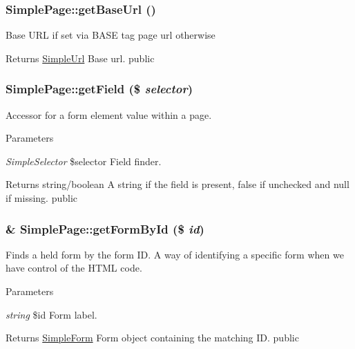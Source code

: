 \hypertarget{class_simple_page_a60f75babe73b4b88e1a22076090153b7}{
\subsubsection[{getBaseUrl}]{\setlength{\rightskip}{0pt plus 5cm}SimplePage::getBaseUrl ()}}
\label{class_simple_page_a60f75babe73b4b88e1a22076090153b7}
Base URL if set via BASE tag page url otherwise \begin{DoxyReturn}{Returns}
\hyperlink{class_simple_url}{SimpleUrl} Base url.  public 
\end{DoxyReturn}
\hypertarget{class_simple_page_afba361a0b510adad072c989e81e92e18}{
\subsubsection[{getField}]{\setlength{\rightskip}{0pt plus 5cm}SimplePage::getField (\$ {\em selector})}}
\label{class_simple_page_afba361a0b510adad072c989e81e92e18}
Accessor for a form element value within a page. 
\begin{DoxyParams}{Parameters}
\item[{\em SimpleSelector}]\$selector Field finder. \end{DoxyParams}
\begin{DoxyReturn}{Returns}
string/boolean A string if the field is present, false if unchecked and null if missing.  public 
\end{DoxyReturn}
\hypertarget{class_simple_page_a3783c4aaa806bbd56f6787456ca45ddb}{
\subsubsection[{getFormById}]{\setlength{\rightskip}{0pt plus 5cm}\& SimplePage::getFormById (\$ {\em id})}}
\label{class_simple_page_a3783c4aaa806bbd56f6787456ca45ddb}
Finds a held form by the form ID. A way of identifying a specific form when we have control of the HTML code. 
\begin{DoxyParams}{Parameters}
\item[{\em string}]\$id Form label. \end{DoxyParams}
\begin{DoxyReturn}{Returns}
\hyperlink{class_simple_form}{SimpleForm} Form object containing the matching ID.  public 
\end{DoxyReturn}
